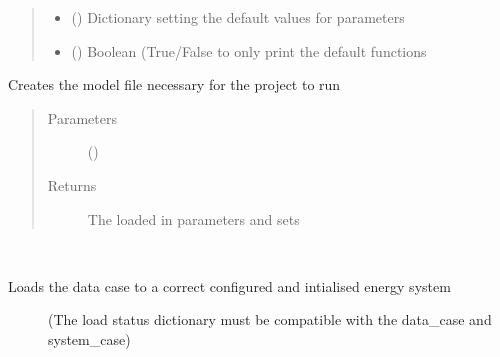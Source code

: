 \documentclass[a4paper,12pt,english]{article}
\begin{document}
\begin{fulllineitems}
\begin{fulllineitems}
\begin{quote}
\begin{description}
\begin{itemize}
\item {} 
 () \textendash{} Dictionary setting the default values for parameters

\item {} 
 () \textendash{} Boolean (True/False to only print the default functions

\end{itemize}

\end{description}\end{quote}

\end{fulllineitems}


\begin{fulllineitems}
\label{\detokenize{GOCPI:GOCPI.Energysystems.Energy_Systems.create_model_file}}
Creates the model file necessary for the project to run
\begin{quote}\begin{description}
\item[{Parameters}] \leavevmode
{} () \textendash{} 

\item[{Returns}] \leavevmode
The loaded in parameters and sets

\end{description}\end{quote}

\end{fulllineitems}


\begin{fulllineitems}
\label{\detokenize{GOCPI:GOCPI.Energysystems.Energy_Systems.load_datacase}}~\begin{description}
\item[{Loads the data case to a correct configured and intialised energy system}] \leavevmode
(The load status dictionary must be compatible with the data\_case and system\_case)


\end{description}
\end{fulllineitems}
\end{fulllineitems}
\end{document}
